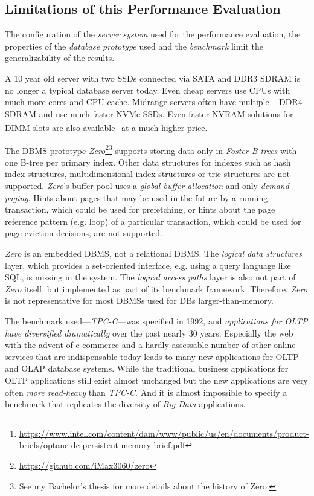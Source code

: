 \subsection[Limitations]{Limitations of this Performance Evaluation} \label{subsec:page_evictioners_limits}

    The configuration of the \emph{server system} used for the performance evaluation, the properties of the \emph{database prototype} used and the \emph{benchmark} limit the generalizability of the results.

    A 10 year old server with two SSDs connected via SATA and DDR3 SDRAM is no longer a typical database server today. Even cheap servers use CPUs with much more cores and CPU cache. Midrange servers often have multiple \si{\tebi\byte} DDR4 SDRAM and use much faster NVMe SSDs. Even faster NVRAM solutions for DIMM slots are also available\footnote{\url{https://www.intel.com/content/dam/www/public/us/en/documents/product-briefs/optane-dc-persistent-memory-brief.pdf}} at a much higher price.

    The DBMS prototype \textit{Zero}\footnote{\url{https://github.com/iMax3060/zero}}\footnote{See my Bachelor's thesis \cite{Gilbert:2017} for more details about the history of Zero.} supports storing data only in \emph{Foster B trees} with one B-tree per primary index. Other data structures for indexes such as hash index structures, multidimensional index structures or trie structures are not supported.  \textit{Zero}'s buffer pool uses a \emph{global buffer allocation} and only \emph{demand paging}. Hints about pages that may be used in the future by a running transaction, which could be used for prefetching, or hints about the page reference pattern (e.g. loop) of a particular transaction, which could be used for page eviction decisions, are not supported.

    \textit{Zero} is an embedded DBMS, not a relational DBMS. The \emph{logical data structures} layer, which provides a set-oriented interface, e.g. using a query language like SQL, is missing in the system. The \emph{logical access paths} layer is also not part of \textit{Zero} itself, but implemented as part of its benchmark framework. Therefore, \textit{Zero} is not representative for most DBMSs used for DBs larger-than-memory.

    The benchmark used---\textit{TPC-C}---was specified in 1992, and \emph{applications for OLTP have diversified dramatically} over the past nearly 30 years. Especially the web with the advent of e-commerce and a hardly assessable number of other online services that are indispensable today leads to many new applications for OLTP and OLAP database systems. While the traditional business applications for OLTP applications still exist almost unchanged but the new applications are very often \emph{more read-heavy} than \textit{TPC-C}. And it is almost impossible to specify a benchmark that replicates the diversity of \emph{Big Data} applications.

